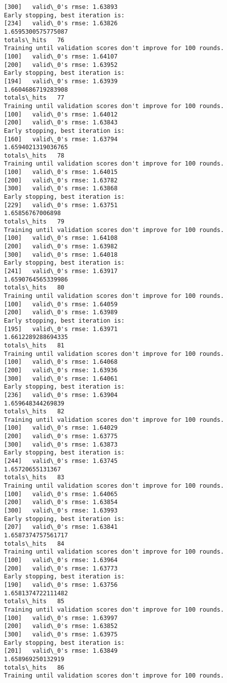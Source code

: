 \documentclass[11pt]{article}
\begin{document}
\begin{Verbatim}[commandchars=\\\{\}]
[300]	valid\_0's rmse: 1.63893
Early stopping, best iteration is:
[234]	valid\_0's rmse: 1.63826
1.6595300575775087
totals\_hits   76
Training until validation scores don't improve for 100 rounds.
[100]	valid\_0's rmse: 1.64107
[200]	valid\_0's rmse: 1.63952
Early stopping, best iteration is:
[194]	valid\_0's rmse: 1.63939
1.6604686719283908
totals\_hits   77
Training until validation scores don't improve for 100 rounds.
[100]	valid\_0's rmse: 1.64012
[200]	valid\_0's rmse: 1.63843
Early stopping, best iteration is:
[160]	valid\_0's rmse: 1.63794
1.6594021319036765
totals\_hits   78
Training until validation scores don't improve for 100 rounds.
[100]	valid\_0's rmse: 1.64015
[200]	valid\_0's rmse: 1.63782
[300]	valid\_0's rmse: 1.63868
Early stopping, best iteration is:
[229]	valid\_0's rmse: 1.63751
1.65856767006898
totals\_hits   79
Training until validation scores don't improve for 100 rounds.
[100]	valid\_0's rmse: 1.64108
[200]	valid\_0's rmse: 1.63982
[300]	valid\_0's rmse: 1.64018
Early stopping, best iteration is:
[241]	valid\_0's rmse: 1.63917
1.6590764565339986
totals\_hits   80
Training until validation scores don't improve for 100 rounds.
[100]	valid\_0's rmse: 1.64059
[200]	valid\_0's rmse: 1.63989
Early stopping, best iteration is:
[195]	valid\_0's rmse: 1.63971
1.6612289288694335
totals\_hits   81
Training until validation scores don't improve for 100 rounds.
[100]	valid\_0's rmse: 1.64068
[200]	valid\_0's rmse: 1.63936
[300]	valid\_0's rmse: 1.64061
Early stopping, best iteration is:
[236]	valid\_0's rmse: 1.63904
1.659648344269839
totals\_hits   82
Training until validation scores don't improve for 100 rounds.
[100]	valid\_0's rmse: 1.64029
[200]	valid\_0's rmse: 1.63775
[300]	valid\_0's rmse: 1.63873
Early stopping, best iteration is:
[244]	valid\_0's rmse: 1.63745
1.65720655131367
totals\_hits   83
Training until validation scores don't improve for 100 rounds.
[100]	valid\_0's rmse: 1.64065
[200]	valid\_0's rmse: 1.63854
[300]	valid\_0's rmse: 1.63993
Early stopping, best iteration is:
[207]	valid\_0's rmse: 1.63841
1.6587374757561717
totals\_hits   84
Training until validation scores don't improve for 100 rounds.
[100]	valid\_0's rmse: 1.63964
[200]	valid\_0's rmse: 1.63773
Early stopping, best iteration is:
[190]	valid\_0's rmse: 1.63756
1.6581374722111482
totals\_hits   85
Training until validation scores don't improve for 100 rounds.
[100]	valid\_0's rmse: 1.63997
[200]	valid\_0's rmse: 1.63852
[300]	valid\_0's rmse: 1.63975
Early stopping, best iteration is:
[201]	valid\_0's rmse: 1.63849
1.658969250132919
totals\_hits   86
Training until validation scores don't improve for 100 rounds.

\end{Verbatim}
\end{document}
